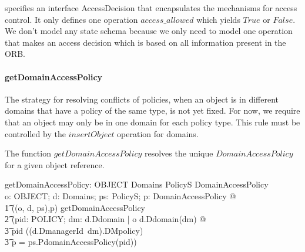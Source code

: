 \corbasec{} specifies an interface AccessDecision that encapsulates the
mechanisms for access control.  It only defines one operation $access\_allowed$
which yields $True$ or $False$.  We don't model any state schema because we only
need to model one operation that makes an access decision which is based on all
information present in the ORB.



\paragraph{getDomainAccessPolicy}
The strategy for resolving conflicts of policies, when an object is in different
domains that have a policy of the same type, is not yet fixed.  For now, we
require that an object may only be in one domain for each policy type.  This
rule must be controlled by the $insertObject$ operation for domains.

The function $getDomainAccessPolicy$ resolves the unique $DomainAccessPolicy$
for a given object reference.  
\begin{axdef}
  getDomainAccessPolicy: OBJECT \cross Domains \cross PolicyS \fun
  DomainAccessPolicy \\
  \where
  \forall o: OBJECT; d: Domains; ps: PolicyS; p: DomainAccessPolicy @ \\
  \t1 ((o, d, ps),p) \in getDomainAccessPolicy \iff \\
  \t2 (\exists pid: POLICY; dm: \dom d.Ddomain | o \in d.Ddomain(dm) @ \\
  \t3 pid \in \ran ((d.DmanagerId~dm).DMpolicy) \land \\
  \t3 p = ps.PdomainAccessPolicy(pid)) \\
\end{axdef}  

